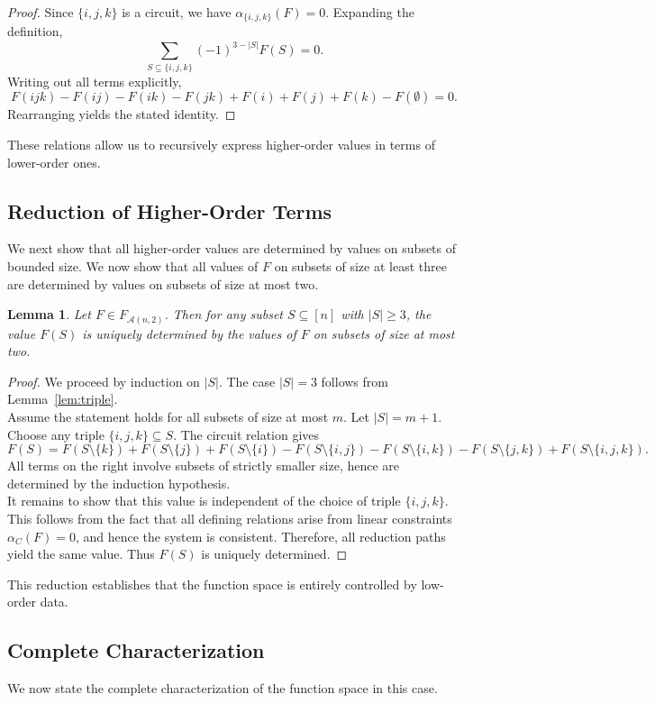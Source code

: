\documentclass{amsart}
\newtheorem{lemma}[theorem]{Lemma}
\theoremstyle{definition}
\begin{document}
\begin{proof}
Since $\{i,j,k\}$ is a circuit, we have $\alpha_{\{i,j,k\}}(F) = 0$. Expanding the definition,
\[
\sum_{S \subseteq \{i,j,k\}} (-1)^{3 - |S|} F(S) = 0.
\]
\noindent
Writing out all terms explicitly,
\[
F(ijk) - F(ij) - F(ik) - F(jk) + F(i) + F(j) + F(k) - F(\emptyset) = 0.
\]
Rearranging yields the stated identity.
\end{proof}
\noindent
These relations allow us to recursively express higher-order values in terms of lower-order ones.

\subsection{Reduction of Higher-Order Terms}
We next show that all higher-order values are determined by values on subsets of bounded size.
We now show that all values of $F$ on subsets of size at least three are determined by values on subsets of size at most two.


\begin{lemma}\label{lem:reduction}
Let $F \in F_{\mathcal{A}(n,2)}$. Then for any subset $S \subseteq [n]$ with $|S| \geq 3$,
the value $F(S)$ is uniquely determined by the values of $F$ on subsets of size at most two.
\end{lemma}

\begin{proof}
We proceed by induction on $|S|$. The case $|S|=3$ follows from Lemma~\ref{lem:triple}.\\
\noindent
Assume the statement holds for all subsets of size at most $m$. Let $|S|=m+1$.
Choose any triple $\{i,j,k\} \subseteq S$. The circuit relation gives
\[
F(S) = F(S \setminus \{k\}) + F(S \setminus \{j\}) + F(S \setminus \{i\})
- F(S \setminus \{i,j\}) - F(S \setminus \{i,k\}) - F(S \setminus \{j,k\})
+ F(S \setminus \{i,j,k\}).
\]
\noindent
All terms on the right involve subsets of strictly smaller size, hence are determined by the induction hypothesis.\\
\noindent
It remains to show that this value is independent of the choice of triple $\{i,j,k\}$.
This follows from the fact that all defining relations arise from linear constraints
$\alpha_C(F)=0$, and hence the system is consistent. Therefore, all reduction paths yield the same value. Thus $F(S)$ is uniquely determined.
\end{proof}
\noindent
This reduction establishes that the function space is entirely controlled by low-order data.
\subsection{Complete Characterization}
We now state the complete characterization of the function space in this case.
\end{document}
